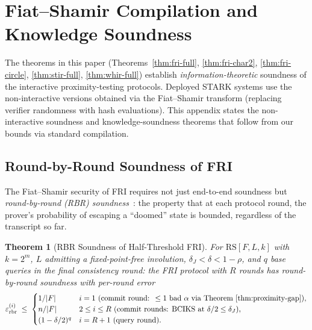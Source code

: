 \documentclass[11pt]{article}
\newtheorem{theorem}{Theorem}
\newcommand{\RS}{\mathrm{RS}}
\begin{document}
\section{Fiat--Shamir Compilation and Knowledge Soundness}
\label{app:fiat-shamir}

The theorems in this paper (Theorems~\ref{thm:fri-full}, \ref{thm:fri-char2}, \ref{thm:fri-circle}, \ref{thm:stir-full}, \ref{thm:whir-full}) establish \emph{information-theoretic} soundness of the interactive proximity-testing protocols.  Deployed STARK systems use the non-interactive versions obtained via the Fiat--Shamir transform (replacing verifier randomness with hash evaluations).  This appendix states the non-interactive soundness and knowledge-soundness theorems that follow from our bounds via standard compilation.

\subsection{Round-by-Round Soundness of FRI}
\label{subsec:rbr}

The Fiat--Shamir security of FRI requires not just end-to-end soundness but \emph{round-by-round (RBR) soundness}~\cite{CCHLRRW,BGKTTW}: the property that at each protocol round, the prover's probability of escaping a ``doomed'' state is bounded, regardless of the transcript so far.

\begin{theorem}[RBR Soundness of Half-Threshold FRI]
\label{thm:fri-rbr}
For $\RS[F, L, k]$ with $k = 2^m$, $L$ admitting a fixed-point-free involution, $\delta_J < \delta < 1{-}\rho$, and $q$ base queries in the final consistency round: the FRI protocol with $R$ rounds has round-by-round soundness with per-round error
$$\varepsilon_{\mathrm{rbr}}^{(i)} \;\leq\; \begin{cases} 1/|F| & i = 1 \textup{ (commit round: } \leq 1 \textup{ bad } \alpha \textup{ via Theorem~\ref{thm:proximity-gap})}, \\ n/|F| & 2 \leq i \leq R \textup{ (commit rounds: BCIKS at } \delta/2 \leq \delta_J\textup{)}, \\ (1 - \delta/2)^q & i = R+1 \textup{ (query round)}. \end{cases}$$
\end{theorem}
\end{document}
